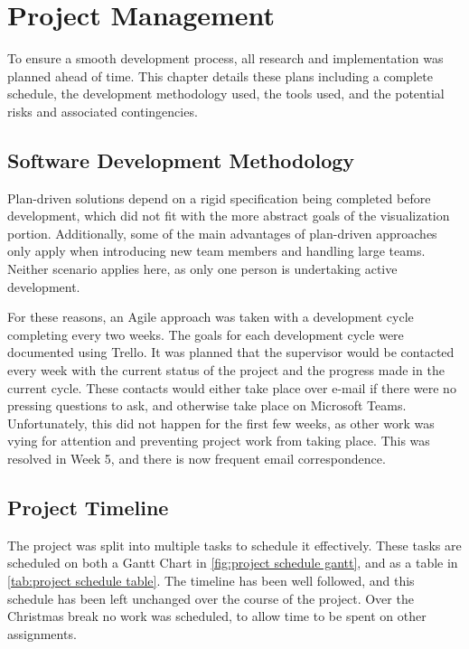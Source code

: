 
\chapter{Project Management}
\label{sec:ProjectManagement}

To ensure a smooth development process, all research and implementation was planned ahead of time.
This chapter details these plans including a complete schedule, the development methodology used, the tools used, and the potential risks and associated contingencies.

\section{Software Development Methodology}
Plan-driven solutions depend on a rigid specification being completed before development\cite{modules:CS261}, which did not fit with the more abstract goals of the visualization portion.
Additionally, some of the main advantages of plan-driven approaches only apply when introducing new team members and handling large teams.
Neither scenario applies here, as only one person is undertaking active development.

For these reasons, an Agile approach was taken with a development cycle completing every two weeks.
The goals for each development cycle were documented using Trello.
It was planned that the supervisor would be contacted every week with the current status of the project and the progress made in the current cycle.
These contacts would either take place over e-mail if there were no pressing questions to ask, and otherwise take place on Microsoft Teams.
Unfortunately, this did not happen for the first few weeks, as other work was vying for attention and preventing project work from taking place.
This was resolved in Week 5, and there is now frequent email correspondence.

\section{Project Timeline}
The project was split into multiple tasks to schedule it effectively.
These tasks are scheduled on both a Gantt Chart in \cref{fig:project schedule gantt}, and as a table in \cref{tab:project schedule table}.
The timeline has been well followed, and this schedule has been left unchanged over the course of the project. 
Over the Christmas break no work was scheduled, to allow time to be spent on other assignments.%

